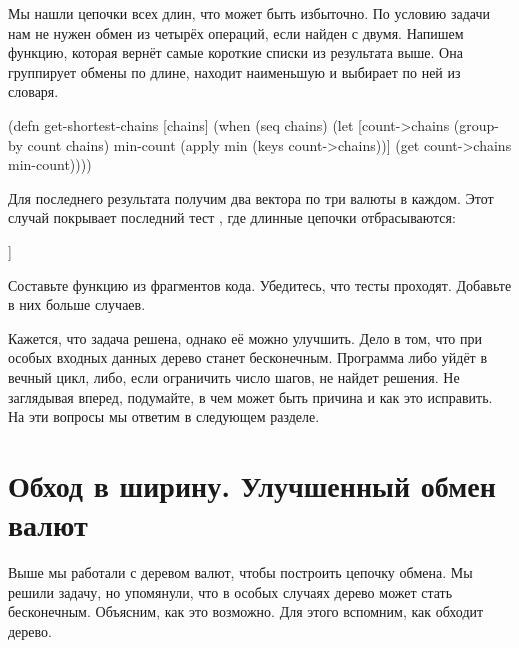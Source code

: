 Мы нашли цепочки всех длин, что может быть избыточно. По условию задачи нам не
нужен обмен из четырёх операций, если найден с двумя. Напишем функцию, которая
вернёт самые короткие списки из результата выше. Она группирует обмены по длине,
находит наименьшую и выбирает по ней из словаря.

\begin{english}
  \begin{clojure}
(defn get-shortest-chains
  [chains]
  (when (seq chains)
    (let [count->chains (group-by count chains)
          min-count (apply min (keys count->chains))]
      (get count->chains min-count))))
  \end{clojure}
\end{english}

Для последнего результата получим два вектора по три валюты в каждом. Этот
случай покрывает последний тест , где длинные цепочки
отбрасываются:

\begin{english}
  \begin{clojure}
[[:usd :rub :yen] [:usd :lir :yen]]
  \end{clojure}
\end{english}

Составьте функцию  из фрагментов кода. Убедитесь, что тесты
проходят. Добавьте в них больше случаев.


Кажется, что задача решена, однако её можно улучшить. Дело в том, что при особых
входных данных дерево станет бесконечным. Программа либо уйдёт в вечный цикл,
либо, если ограничить число шагов, не найдет решения. Не заглядывая вперед,
подумайте, в чем может быть причина и как это исправить. На эти вопросы мы
ответим в следующем разделе.

\section{Обход в ширину. Улучшенный обмен валют}


Выше мы работали с деревом валют, чтобы построить цепочку обмена. Мы решили
задачу, но упомянули, что в особых случаях дерево может стать
бесконечным. Объясним, как это возможно. Для этого вспомним, как 
обходит дерево.

\def\urldepthfirst{https://en.wikipedia.org/wiki/Depth-first\_search}

